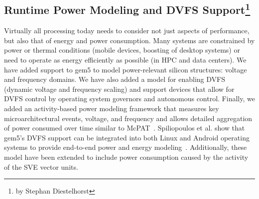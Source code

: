 \subsection[Runtime Power Modeling and DVFS Support]{Runtime Power Modeling and DVFS Support\footnote{by Stephan Diestelhorst}}
\label{sec:dvfs}

Virtually all processing today needs to consider not just aspects of performance, but also that of energy and power consumption.
Many systems are constrained by power or thermal conditions (mobile devices, boosting of desktop systems) or need to operate as energy efficiently as possible (in HPC and data centers).
We have added support to gem5 to model power-relevant silicon structures: voltage and frequency domains.
We have also added a model for enabling DVFS (dynamic voltage and frequency scaling) and support devices that allow for DVFS control by operating system governors and autonomous control.
Finally, we added an activity-based power modeling framework that measures key microarchitectural events, voltage, and frequency and allows detailed aggregation of power consumed over time similar to McPAT~\cite{LiAhn2009-mcpat, LiAhn2013-mcpat}.
Spiliopoulos et al. show that gem5's DVFS support can be integrated into both Linux and Android operating systems to provide end-to-end power and energy modeling~\cite{SpiliopoulosBHAK13}.
Additionally, these model have been extended to include power consumption caused by the activity of the SVE vector units.
